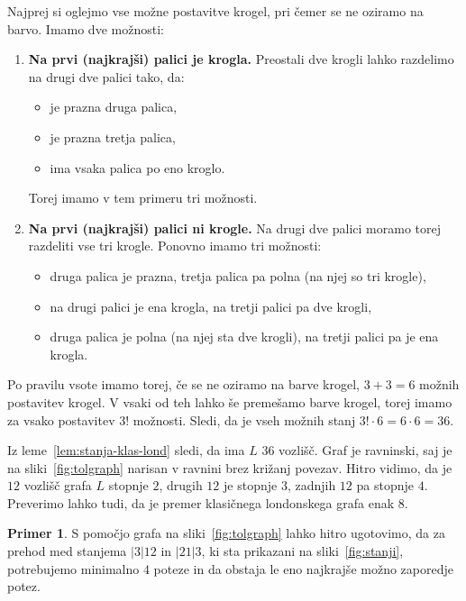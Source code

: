 \documentclass[12pt,a4paper]{amsart}
\theoremstyle{definition} %
\newtheorem{primer}[definicija]{Primer}
\theoremstyle{plain} %
\begin{document}
\proof
    Najprej si oglejmo vse možne postavitve krogel, pri čemer se ne oziramo na barvo.
    Imamo dve možnosti:
    \begin{enumerate}
        \item \textbf{Na prvi (najkrajši) palici je krogla.}
        Preostali dve krogli lahko razdelimo na drugi dve palici tako, da:
        \begin{itemize}[label={--}]
            \item je prazna druga palica,
            \item je prazna tretja palica,
            \item ima vsaka palica po eno kroglo.
        \end{itemize}
        Torej imamo v tem primeru tri možnosti.
        
        \item \textbf{Na prvi (najkrajši) palici ni krogle.}
        Na drugi dve palici moramo torej razdeliti vse tri krogle.
        Ponovno imamo tri možnosti:
        \begin{itemize}[label={--}]
            \item druga palica je prazna, tretja palica pa polna (na njej so tri krogle),
            \item na drugi palici je ena krogla, na tretji palici pa dve krogli,
            \item druga palica je polna (na njej sta dve krogli), na tretji palici pa je ena krogla.
        \end{itemize}
    \end{enumerate}
    Po pravilu vsote imamo torej, če se ne oziramo na barve krogel, $3+3=6$ možnih postavitev krogel.
    V vsaki od teh lahko še premešamo barve krogel, torej imamo za vsako postavitev $3!$ možnosti. Sledi, da je vseh možnih stanj $3! \cdot 6 = 6 \cdot 6 = 36$.\qedhere
\endproof

Iz leme~\ref{lem:stanja-klas-lond} sledi, da ima $L$ $36$ vozlišč. Graf je ravninski, saj je na sliki~\ref{fig:tolgraph} narisan v ravnini brez križanj povezav. Hitro vidimo, da je $12$ vozlišč grafa $L$ stopnje $2$, drugih $12$ je stopnje $3$, zadnjih $12$ pa stopnje $4$. Preverimo lahko tudi, da je premer klasičnega londonskega grafa enak $8$.

\begin{primer}
    S pomočjo grafa na sliki~\ref{fig:tolgraph} lahko hitro ugotovimo, da za prehod med stanjema $|3|12$ in $|21|3$, ki sta prikazani na sliki~\ref{fig:stanji}, potrebujemo minimalno $4$ poteze in da obstaja le eno najkrajše možno zaporedje potez.
\end{primer}
\end{document}
